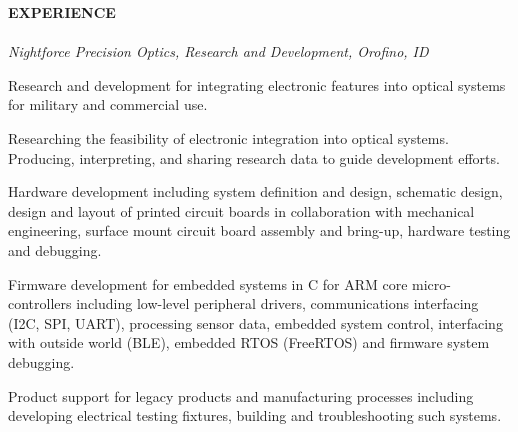 \documentclass[10pt,letterpaper]{article}
\begin{document}
{\noindent\sc\bf EXPERIENCE}\vspace{.5pc}\\
\indent{}	\hspace*{\fill}{ March 2018} \\
\indent\indent %
{\sl Nightforce Precision Optics, Research and Development, Orofino, ID}
				\vspace{0.1in}
                 \begin{itemize}[leftmargin=0.75in, rightmargin=0.25in, topsep=0mm,itemindent=0mm, label=\textrm{--}]
  {\small\sl
\item Research and development for integrating electronic features into optical systems for military and commercial use. 
\item Researching the feasibility of electronic integration into optical systems. Producing, interpreting, and sharing research data to guide development efforts. 
\item Hardware development including system definition and design, schematic design, design and layout of printed circuit boards in collaboration with mechanical engineering, surface mount circuit board assembly and bring-up, hardware testing and debugging.
\item Firmware development for embedded systems in C for ARM core micro-controllers including low-level peripheral drivers, communications interfacing (I2C, SPI, UART),  processing sensor data, embedded system control, interfacing with outside world (BLE), embedded RTOS (FreeRTOS) and firmware system debugging. 
\item Product support for legacy products and manufacturing processes including developing electrical testing fixtures, building and troubleshooting  such systems. 
}
\end{itemize}

\vspace*{\fill}
\end{document}
